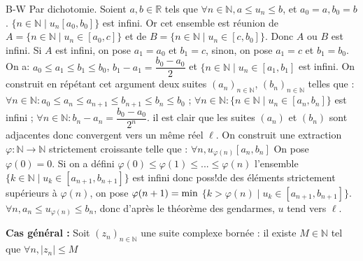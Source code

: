 \documentclass[12pt,a4paper]{report}
\begin{document}
\begin{demonstration}{B-W}
\newline \newline {}
\newline Par dichotomie. Soient $a,b \in \mathbb{R}$ tels que $\forall n \in \mathbb{N}, a \leq u_n \leq b$, et $a_0 = a, b_0 = b$.
\newline $\{n \in \mathbb{N} \mid u_n \left[a_0, b_0 \right] \}$ est infini. Or cet ensemble est réunion de $A = \{ n \in \mathbb{N} \mid u_n \in \left[a_0,c\right] \}$ et de $B = \{ n \in \mathbb{N} \mid u_n \in \left[c,b_0\right] \}$.
\newline Donc $A$ ou $B$ est infini. Si $A$ est infini, on pose $a_1 = a_0$ et $b_1 = c$, sinon, on pose $a_1 = c$ et $b_1 = b_0$. On a: $a_0 \leq a_1 \leq b_1 \leq b_0$, $b_1-a_1=\dfrac{b_0-a_0}{2}$ et $\{n \in \mathbb{N} \mid u_n \in \left[a_1,b_1\right]$ est infini.
\newline On construit en répétant cet argument deux suites $(a_n)_{n \in \mathbb{N}}$, $(b_n)_{n \in \mathbb{N}}$ telles que : 
\newline $\forall n \in \mathbb{N} : a_0 \leq a_n \leq a_{n+1} \leq b_{n+1} \leq b_n \leq b_0$ ;
\newline $\forall n \in \mathbb{N} : \{n \in \mathbb{N} \mid u_n \in \left[a_n,b_n\right] \}$ est infini ;
\newline $\forall n \in \mathbb{N} : b_n-a_n = \dfrac{b_0-a_0}{2^n}.$
\newline il est clair que les suites $(a_n)$ et $(b_n)$ sont adjacentes donc convergent vers un même réel $\ell$.
\newline On construit une extraction $\varphi : \mathbb{N} \rightarrow \mathbb{N}$ strictement croissante telle que : $\forall n, u_{\varphi(n)} \left[a_n,b_n\right]$
\newline On pose $\varphi(0) = 0$. Si on a défini $\varphi(0) \leq \varphi(1) \leq  ... \leq \varphi(n)$ l'ensemble $\{ k \in \mathbb{N} \mid u_k \in \left[a_{n+1}, b_{n+1}\right] \}$ est infini donc poss!de des éléments strictement supérieurs à $\varphi(n)$, on pose $\varphi(n+1) = \rm{min}$ $\{k > \varphi(n) \mid u_k \in \left[a_{n+1}, b_{n+1} \right] \}$.
\newline $\forall n, a_n \leq u_{\varphi(n)} \leq b_n$, donc d'après le théorème des gendarmes, $u$ tend vers $\ell$.
\newline \par \textbf{Cas général :} Soit $(z_n)_{n \in \mathbb{N}}$ une suite complexe bornée : il existe $M \in \mathbb{N}$ tel que $\forall n, \lvert z_n \rvert \leq M$

\end{demonstration}
\end{document}
